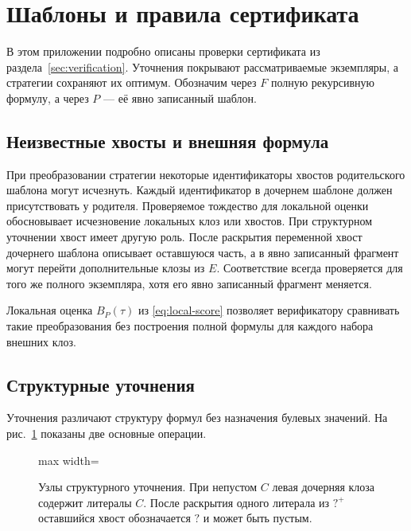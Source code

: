 \documentclass[10pt,twoside]{article}
\newcommand{\anytail}{\mathord{?}}
\newcommand{\plustail}{\mathord{?}^{+}}
\theoremstyle{definition}
\theoremstyle{remark}
\begin{document}
\section{Шаблоны и правила сертификата}
\label{sec:certificate}

В этом приложении подробно описаны проверки сертификата из
раздела~\ref{sec:verification}. Уточнения покрывают рассматриваемые
экземпляры, а стратегии сохраняют их оптимум. Обозначим через $F$
полную рекурсивную формулу, а через $P$ --- её явно записанный шаблон.

\subsection{Неизвестные хвосты и внешняя формула}

При преобразовании стратегии некоторые идентификаторы хвостов
родительского шаблона могут исчезнуть. Каждый идентификатор в дочернем
шаблоне должен присутствовать у родителя. Проверяемое тождество для
локальной оценки обосновывает исчезновение локальных клоз или хвостов.
При структурном уточнении хвост имеет другую роль. После раскрытия
переменной хвост дочернего шаблона описывает оставшуюся часть, а в явно
записанный фрагмент могут перейти дополнительные клозы из $E$.
Соответствие всегда проверяется для того же полного экземпляра, хотя
его явно записанный фрагмент меняется.

Локальная оценка $B_P(\tau)$ из \eqref{eq:local-score} позволяет
верификатору сравнивать такие преобразования без построения полной
формулы для каждого набора внешних клоз.

\subsection{Структурные уточнения}
\label{sec:refinements}

Уточнения различают структуру формул без назначения булевых значений.
На рис.~\ref{fig:refinement} показаны две основные операции.

\begin{figure}[!htbp]
\centering
\begin{adjustbox}{max width=\linewidth}
\end{adjustbox}
\caption{Узлы структурного уточнения. При непустом $C$ левая
дочерняя клоза содержит литералы $C$. После раскрытия одного литерала
из $\plustail$ оставшийся хвост обозначается $\anytail$ и может быть
пустым.}
\label{fig:refinement}
\end{figure}
\end{document}
